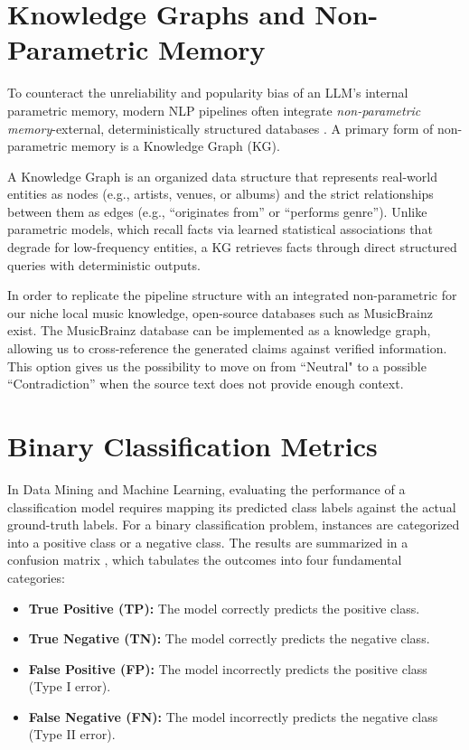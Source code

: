 \newpage
 \section{Knowledge Graphs and Non-Parametric Memory}\label{pre:sec:kg}
To counteract the unreliability and popularity bias of an LLM's internal parametric memory, modern NLP pipelines often integrate \textit{non-parametric memory}-external, deterministically structured databases \cite{mallen2023when}. A primary form of non-parametric memory is a Knowledge Graph (KG). 

A Knowledge Graph is an organized data structure that represents real-world entities as nodes (e.g., artists, venues, or albums) and the strict relationships between them as edges (e.g., ``originates from'' or ``performs genre''). Unlike parametric models, which recall facts via learned statistical associations that degrade for low-frequency entities, a KG retrieves facts through direct structured queries with deterministic outputs.

In order to replicate the pipeline structure with an integrated non-parametric for our niche local music knowledge, open-source databases such as MusicBrainz exist. The MusicBrainz database can be implemented as a knowledge graph, allowing us to cross-reference the generated claims against verified information. This option gives us the possibility to move on from ``Neutral" to a possible ``Contradiction'' when the source text does not provide enough context. 

\section{Binary Classification Metrics}
\label{sec:binary_metrics}
In Data Mining and Machine Learning, evaluating the performance of a classification model requires mapping its predicted class labels against the actual ground-truth labels. For a binary classification problem, instances are categorized into a positive class or a negative class. The results are summarized in a confusion matrix \cite{tan2019introduction}, which tabulates the outcomes into four fundamental categories:

\begin{itemize}
    \item \textbf{True Positive (TP):} The model correctly predicts the positive class.
    \item \textbf{True Negative (TN):} The model correctly predicts the negative class.
    \item \textbf{False Positive (FP):} The model incorrectly predicts the positive class (Type I error).
    \item \textbf{False Negative (FN):} The model incorrectly predicts the negative class (Type II error).
\end{itemize}

